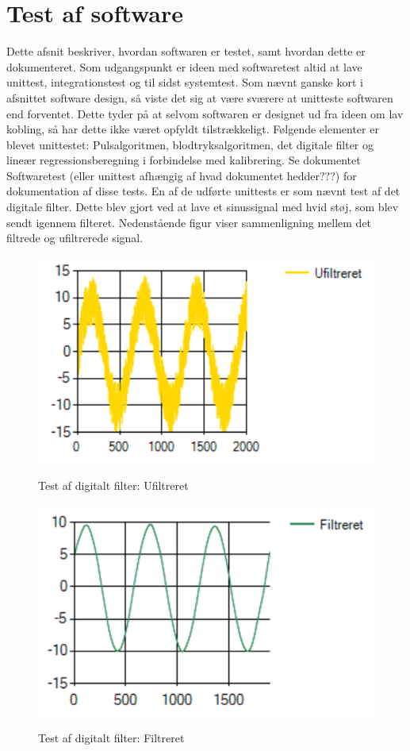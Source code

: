 \section{Test af software}
Dette afsnit beskriver, hvordan softwaren er testet, samt hvordan dette er dokumenteret. Som udgangspunkt er ideen med softwaretest altid at lave unittest, integrationstest og til sidst systemtest. Som nævnt ganske kort i afsnittet software design, så viste det sig at være sværere at unitteste softwaren end forventet. Dette tyder på at selvom softwaren er designet ud fra ideen om lav kobling, så har dette ikke været opfyldt tilstrækkeligt. 
Følgende elementer er blevet unittestet: Pulsalgoritmen, blodtryksalgoritmen, det digitale filter og lineær regressionsberegning i forbindelse med kalibrering. Se dokumentet Softwaretest (eller unittest afhængig af hvad dokumentet hedder???) for dokumentation af disse tests. 
En af de udførte unittests er som nævnt test af det digitale filter. Dette blev gjort ved at lave et sinussignal med hvid støj, som blev sendt igennem filteret. Nedenstående figur viser sammenligning mellem det filtrede og ufiltrerede signal. 

\vspace{0.5 cm}
\begin{figure}[h!]
	\centering
	\includegraphics[width=0.55\linewidth]{Implementering_og_test/Software/ufiltreret}
	\label{fig:ufiltreret}
	\caption{Test af digitalt filter: Ufiltreret}
\end{figure}

\begin{figure}[h!]
	\centering
	\includegraphics[width=0.54\linewidth]{Implementering_og_test/Software/filtreret}
	\label{fig:filtreret}
	\caption{Test af digitalt filter: Filtreret}
\end{figure}

